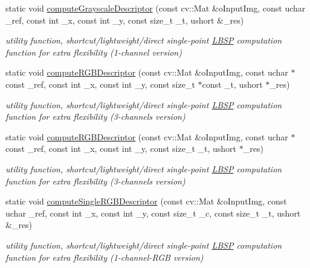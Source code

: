 \begin{DoxyCompactItemize}
\item 
static void \mbox{\hyperlink{class_l_b_s_p_a4a5f635868b6b81ba53df2692ee3dfd8}{compute\+Grayscale\+Descriptor}} (const cv\+::\+Mat \&o\+Input\+Img, const uchar \+\_\+ref, const int \+\_\+x, const int \+\_\+y, const size\+\_\+t \+\_\+t, ushort \&\+\_\+res)
\begin{DoxyCompactList}\small\item\em utility function, shortcut/lightweight/direct single-\/point \mbox{\hyperlink{class_l_b_s_p}{L\+B\+SP}} computation function for extra flexibility (1-\/channel version) \end{DoxyCompactList}\item 
static void \mbox{\hyperlink{class_l_b_s_p_a27a44cb6f6e3015ee26047bd3d84f892}{compute\+R\+G\+B\+Descriptor}} (const cv\+::\+Mat \&o\+Input\+Img, const uchar $\ast$const \+\_\+ref, const int \+\_\+x, const int \+\_\+y, const size\+\_\+t $\ast$const \+\_\+t, ushort $\ast$\+\_\+res)
\begin{DoxyCompactList}\small\item\em utility function, shortcut/lightweight/direct single-\/point \mbox{\hyperlink{class_l_b_s_p}{L\+B\+SP}} computation function for extra flexibility (3-\/channels version) \end{DoxyCompactList}\item 
static void \mbox{\hyperlink{class_l_b_s_p_a806e1de0fdf2a59acb9fa1303b62b102}{compute\+R\+G\+B\+Descriptor}} (const cv\+::\+Mat \&o\+Input\+Img, const uchar $\ast$const \+\_\+ref, const int \+\_\+x, const int \+\_\+y, const size\+\_\+t \+\_\+t, ushort $\ast$\+\_\+res)
\begin{DoxyCompactList}\small\item\em utility function, shortcut/lightweight/direct single-\/point \mbox{\hyperlink{class_l_b_s_p}{L\+B\+SP}} computation function for extra flexibility (3-\/channels version) \end{DoxyCompactList}\item 
static void \mbox{\hyperlink{class_l_b_s_p_a35f2abfacc0d540810d678ff5e8cd619}{compute\+Single\+R\+G\+B\+Descriptor}} (const cv\+::\+Mat \&o\+Input\+Img, const uchar \+\_\+ref, const int \+\_\+x, const int \+\_\+y, const size\+\_\+t \+\_\+c, const size\+\_\+t \+\_\+t, ushort \&\+\_\+res)
\begin{DoxyCompactList}\small\item\em utility function, shortcut/lightweight/direct single-\/point \mbox{\hyperlink{class_l_b_s_p}{L\+B\+SP}} computation function for extra flexibility (1-\/channel-\/\+R\+GB version) \end{DoxyCompactList}\item 

\end{DoxyCompactItemize}
